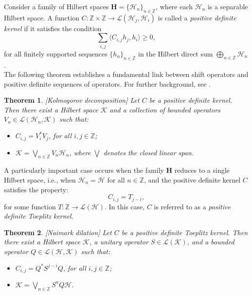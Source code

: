 \documentclass[11pt]{article}
\newtheorem{theorem}{Theorem}[section]
\begin{document}
Consider a family of Hilbert spaces \( \mathbf{H} = \{ \mathcal{H}_n \}_{n \in \mathbb{Z}} \), where each \( \mathcal{H}_n \) is a separable Hilbert space. A function \( C: \mathbb{Z} \times \mathbb{Z} \to \mathcal{L}(\mathcal{H}_j, \mathcal{H}_i) \) is called a \textit{positive definite kernel} if it satisfies the condition
\[
\sum_{i,j} \langle C_{i,j} h_j, h_i \rangle \geq 0,
\]
for all finitely supported sequences \( \{ h_n \}_{n \in \mathbb{Z}} \) in the Hilbert direct sum \( \bigoplus_{n \in \mathbb{Z}} \mathcal{H}_n \). \\

The following theorem establishes a fundamental link between shift operators and positive definite sequences of operators. For further background, see \cite{Con}.

\begin{theorem} \label{thm:kolmoDecomp}[Kolmogorov decomposition]
Let \( C \) be a positive definite kernel. Then there exist a Hilbert space \( \mathcal{K} \) and a collection of bounded operators \( V_n \in \mathcal{L}(\mathcal{H}_n, \mathcal{K}) \) such that:
\begin{itemize}
    \item \( C_{i,j} = V_i^* V_j \), for all \( i,j \in \mathbb{Z} \);
    \item \( \mathcal{K} = \bigvee_{n \in \mathbb{Z}} V_n \mathcal{H}_n \), where \( \bigvee \) denotes the closed linear span.
\end{itemize}
\end{theorem}

A particularly important case occurs when the family \( \mathbf{H} \) reduces to a single Hilbert space, i.e., when \( \mathcal{H}_n = \mathcal{H} \) for all \( n \in \mathbb{Z} \), and the positive definite kernel \( C \) satisfies the property:
\[
C_{i,j} = T_{j-i},
\]
for some function \( T: \mathbb{Z} \to \mathcal{L}(\mathcal{H}) \). In this case, \( C \) is referred to as a \textit{positive definite Toeplitz kernel}.

\begin{theorem} \label{thm:naimark}[Naimark dilation]
Let \( C \) be a positive definite Toeplitz kernel. Then there exist a Hilbert space \( \mathcal{K} \), a unitary operator \( S \in \mathcal{L}(\mathcal{K}) \), and a bounded operator \( Q \in \mathcal{L}(\mathcal{H}, \mathcal{K}) \) such that:
\begin{itemize}
    \item \( C_{i,j} = Q^* S^{j-i} Q \), for all \( i,j \in \mathbb{Z} \);
    \item \( \mathcal{K} = \bigvee_{n \in \mathbb{Z}} S^n Q \mathcal{H}\).
\end{itemize}
\end{theorem}
\end{document}
